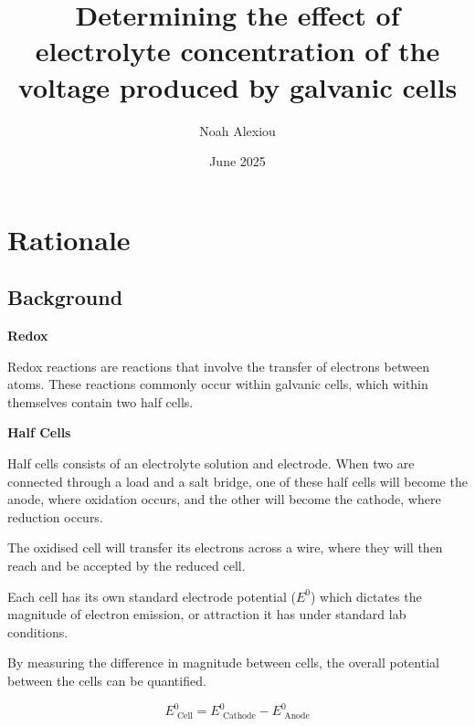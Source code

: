 \documentclass[11pt,a4paper]{article}
\begin{document}
	\nocite{*}
	
	\begin{titlepage}
		
		
		\title{Determining the effect of electrolyte concentration of the voltage produced by galvanic cells}
		
		\author{Noah Alexiou}
		
		
		\date{June 2025}
		
		\maketitle
		\centering
		
	\end{titlepage}
	\tableofcontents
	\newpage
	
	
	\section{Rationale}
	
	
	\subsection{Background}

	

	\textbf{Redox}
	
	Redox reactions are reactions that involve the transfer of electrons between atoms. These reactions commonly occur within galvanic cells, which within themselves contain two half cells. 
	

	\textbf{Half Cells}
	
	Half cells consists of an electrolyte solution and electrode. When two are connected through a load and a salt  bridge, one of these half cells will become the anode, where oxidation occurs, and the other will become the cathode, where reduction occurs.
	
	The oxidised cell will transfer its electrons across a wire, where they will then reach and be accepted by the reduced cell.
	
	Each cell has its own standard electrode potential ($E^0$) which dictates the magnitude of electron emission, or attraction it has under standard lab conditions. 
	
	By measuring the difference in magnitude between cells, the overall potential between the cells can be quantified. 
	
	$$
	E^0_{\textrm{ Cell}}=E^0_{\textrm{ Cathode}}-E^0_{\textrm{ Anode}}
	$$
	
	
	
\end{document}
